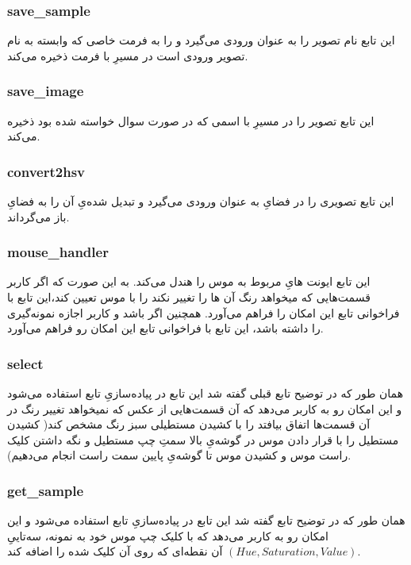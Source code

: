 \documentclass[a4paper,12pt]{article}
\begin{document}
  \subsubsection*{save\_sample}
  این تابع نام تصویر را به عنوان ورودی می‌گیرد و 
  را به فرمت خاصی که وابسته به نام تصویر ورودی است در مسیرِ
  با فرمت
  ذخیره می‌کند.
  \subsubsection*{save\_image}
  این تابع تصویر را در مسیرِ
  با اسمی که در صورت سوال خواسته شده بود ذخیره می‌کند.
  \subsubsection*{convert2hsv}
  این تایع تصویری را در فضایِ
   به عنوان ورودی می‌گیرد و تبدیل شده‌یِ آن را به فضایِ
  باز می‌گرداند.
  \subsubsection*{mouse\_handler}
  این تابع ایونت هایِ مربوط به موس را هندل می‌کند. به این صورت که اگر کاربر قسمت‌هایی که میخواهد رنگ آن ها را تغییر نکند را با موس تعیین کند،‌این تابع با فراخوانی تابع 
  این امکان را فراهم می‌آورد. همچنین اگر 
  باشد و کاربر اجازه نمونه‌گیری را داشته باشد، این تابع با فراخوانی تابع
  این امکان رو فراهم می‌آورد.
  \subsubsection*{select}
  همان طور که در توضیح تابع قبلی گفته شد این تابع در پیاده‌سازیِ تابع
  استفاده می‌شود و این امکان رو به کاربر می‌دهد که آن قسمت‌هایی از عکس که نمیخواهد تغییر رنگ در آن قسمت‌ها اتفاق بیافتد را با کشیدن مستطیلی سبز رنگ مشخص کند( کشیدن مستطیل را با قرار دادن موس در گوشه‌یِ بالا سمتِ چپ مستطیل و نگه داشتن کلیک راست موس و کشیدن موس تا گوشه‌یِ پایین سمت راست انجام می‌دهیم).
  \subsubsection*{get\_sample}
  همان طور که در توضیح تابع 
   گفته شد این تابع در پیاده‌سازیِ تابع
  استفاده می‌شود و این امکان رو به کاربر می‌دهد که با کلیک چپ موس خود به نمونه، سه‌تاییِ
  $ (Hue
  ,
  Saturation
  ,
  Value) $
  آن نقطه‌ای که روی آن کلیک شده را اضافه کند.
\end{document}
